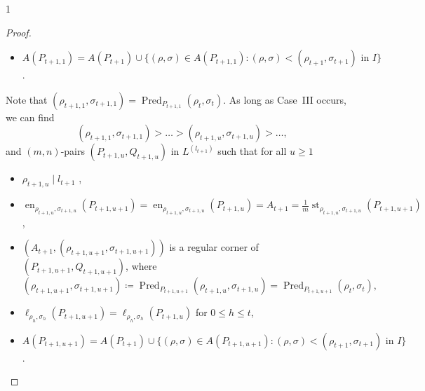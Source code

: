 \documentclass[reqno,a4paper,twoside]{amsart}
\theoremstyle{definition}
\theoremstyle{remark}
\DeclareMathOperator{\en}{en}
\DeclareMathOperator{\st}{st}
\DeclareMathOperator{\Pred}{Pred}
\begin{document}
\begin{spacing}{1}
\begin{proof}
\begin{itemize}[itemsep=0.5675ex,topsep=0.5675ex]
\item[-] $A(P_{t+1,1}) = A(P_{t+1})\cup\{(\rho,\sigma)\in A(P_{t+1,1}):(\rho,\sigma)<(\rho_{t+1},\sigma_{t+1}) \text{ in } I\}$.

\end{itemize}
Note that $(\rho_{t+1,1},\sigma_{t+1,1}) = \Pred_{P_{t+1,1}} (\rho_t,\sigma_t)$. As long as Case~III occurs, we can find
$$
(\rho_{t+1,1},\sigma_{t+1,1})> \dots> (\rho_{t+1,u},\sigma_{t+1,u})>\dots,
$$
and $(m,n)$-pairs $(P_{t+1,u},Q_{t+1,u})$ in $L^{(l_{t+1})}$ such that for all $u\ge 1$

\begin{itemize}[itemsep=0.5675ex,topsep=0.5675ex]

\item[-] $\rho_{t+1,u}\mid l_{t+1}$ ,

\item[-] $\en_{\rho_{t+1,u},\sigma_{t+1,u}}(P_{t+1,u+1}) = \en_{\rho_{t+1,u},\sigma_{t+1,u}} (P_{t+1,u}) = A_{t+1} = \frac{1}{m}\st_{\rho_{t+1,u},\sigma_{t+1,u}}(P_{t+1,u+1})$,

\item[-] $(A_{t+1},(\rho_{t+1,u+1},\sigma_{t+1,u+1}))$ is a regular corner of $(P_{t+1,u+1},Q_{t+1,u+1})$, where
$$
(\rho_{t+1,u+1},\sigma_{t+1,u+1})\coloneqq \Pred_{P_{t+1,u+1}} (\rho_{t+1,u},\sigma_{t+1,u}) = \Pred_{P_{t+1,u+1}} (\rho_t,\sigma_t),
$$

\item[-] $\ell_{\rho_h,\sigma_h}(P_{t+1,u+1}) = \ell_{\rho_h,\sigma_h}(P_{t+1,u})$ for $0\le h\le t$,

\item[-] $A(P_{t+1,u+1}) =  A(P_{t+1}) \cup \{(\rho,\sigma)\in A(P_{t+1,u+1}):(\rho,\sigma)< (\rho_{t+1}, \sigma_{t+1}) \text{ in } I\}$.


\end{itemize}
\end{proof}
\end{spacing}
\end{document}
